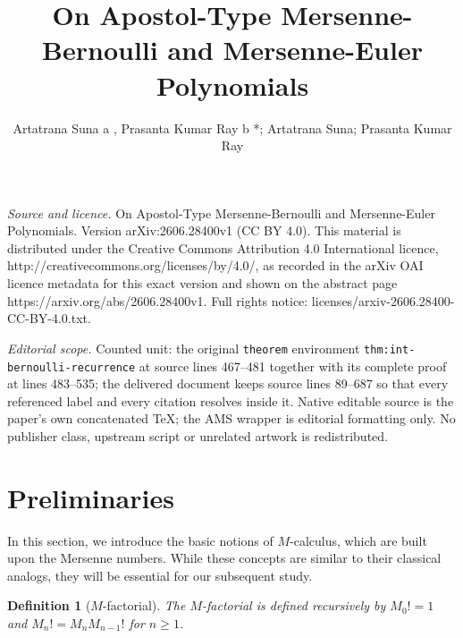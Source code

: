 \documentclass[10pt,a4paper]{amsart}
\newtheorem{definition}[theorem]{Definition}
\numberwithin{equation}{section}
\begin{document}
\title[On Apostol-Type Mersenne-Bernoulli and Mersenne-Euler Polyno]{On Apostol-Type Mersenne-Bernoulli and Mersenne-Euler Polynomials}
\author{Artatrana Suna a , Prasanta Kumar Ray b *; Artatrana Suna; Prasanta Kumar Ray}
\date{}
\maketitle
\noindent\emph{Source and licence.} On Apostol-Type Mersenne-Bernoulli and Mersenne-Euler Polynomials. Version arXiv:2606.28400v1 (CC BY 4.0). This material is distributed under the Creative Commons Attribution 4.0 International licence, http://creativecommons.org/licenses/by/4.0/, as recorded in the arXiv OAI licence metadata for this exact version and shown on the abstract page https://arxiv.org/abs/2606.28400v1. Full rights notice: licenses/arxiv-2606.28400-CC-BY-4.0.txt.\par\smallskip
\noindent\textit{Editorial scope.} Counted unit: the original \texttt{theorem} environment \texttt{thm:int-bernoulli-recurrence} at source lines 467--481 together with its complete proof at lines 483--535; the delivered document keeps source lines 89--687 so that every referenced label and every citation resolves inside it. Native editable source is the paper's own concatenated TeX; the AMS wrapper is editorial formatting only. No publisher class, upstream script or unrelated artwork is redistributed.
\section{Preliminaries}

In this section, we introduce the basic notions of $M$-calculus, which are built upon the Mersenne numbers. While these concepts are similar to their classical analogs, they will be essential for our subsequent study.
\begin{definition}[$M$-factorial]
The $M$-factorial is defined recursively by $M_0! = 1$ and $M_n! = M_n M_{n-1}!$ for $n\ge 1$.
\end{definition}
\end{document}
